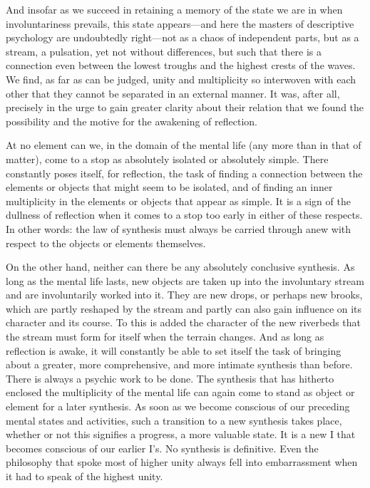 \documentclass[12pt,a4paper]{book}
\newcommand{\opage}[1]{\marginnote{\footnotesize\textit{[#1]}}}
\begin{document}
And insofar as we succeed in retaining a memory of the state we are in
when involuntariness prevails, \opage{13}this state appears---and here the masters
of descriptive psychology are undoubtedly right---not as a chaos of
independent parts, but as a stream, a pulsation, yet not without
differences, but such that there is a connection even between the lowest
troughs and the highest crests of the waves. We find, as far as can be
judged, unity and multiplicity so interwoven with each other that they
cannot be separated in an external manner. It was, after all, precisely
in the urge to gain greater clarity about their relation that we found
the possibility and the motive for the awakening of reflection.

At no element can we, in the domain of the mental life (any more than in
that of matter), come to a stop as absolutely isolated or absolutely
simple. There constantly poses itself, for reflection, the task of
finding a connection between the elements or objects that might seem to
be isolated, and of finding an inner multiplicity in the elements or
objects that appear as simple. It is a sign of the dullness of
reflection when it comes to a stop too early in either of these
respects. In other words: the law of synthesis must always be carried
through anew with respect to the objects or elements themselves.

On the other hand, neither can there be any absolutely conclusive
synthesis. As long as the mental life lasts, new objects are taken up
into the involuntary stream and are involuntarily worked into it. They
are new drops, or perhaps new brooks, which are partly reshaped by the
stream and partly can also gain influence on its character and its
course. To this is added the character of the new riverbeds that the
stream must form for itself when the terrain changes. And as long as
reflection is awake, it will constantly be able to set itself the task
of bringing about a greater, more comprehensive, and more intimate
synthesis than before. There is always a psychic work to be done. The
synthesis that has hitherto enclosed the multiplicity of the mental life
can again come to stand as object or element for a later synthesis. As
soon as we become conscious of our preceding mental states and
activities, such a transition to a new synthesis takes place, whether or
not this signifies a progress, a more valuable state. It is a \opage{14}new I that
becomes conscious of our earlier I's. No synthesis is definitive. Even
the philosophy that spoke most of higher unity always fell into
embarrassment when it had to speak of the highest unity.
\end{document}
